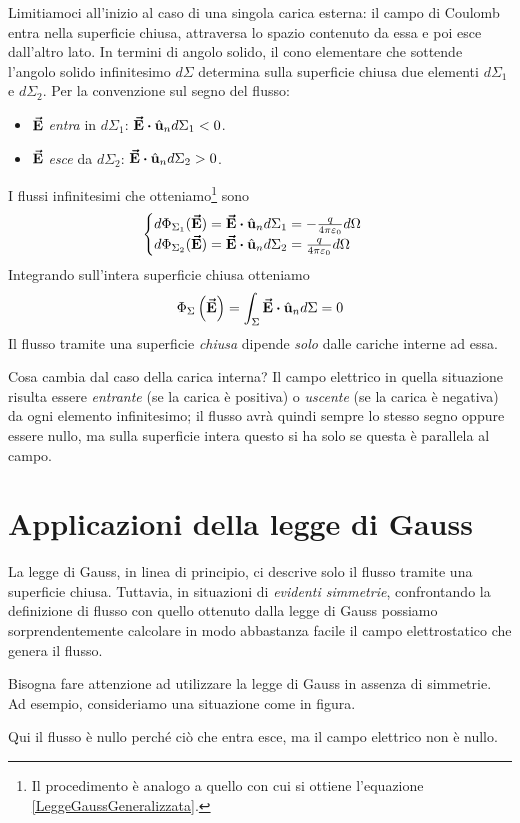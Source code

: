 Limitiamoci all'inizio al caso di una singola carica esterna: il campo di Coulomb entra nella superficie chiusa, attraversa lo spazio contenuto da essa e poi esce dall'altro lato. In termini di angolo solido, il cono elementare che sottende l'angolo solido infinitesimo $d\Sigma$ determina sulla superficie chiusa due elementi $d\Sigma_1$ e $d\Sigma_2$. Per la convenzione sul segno del flusso:
\begin{itemize}
	\item $\vb*{\va{E}}$ \textit{entra} in $d\Sigma_1$: $\vba{E}\vdot \vbh{u}_n d\Sigma_1<0$.
	\item $\vb*{\va{E}}$ \textit{esce} da $d\Sigma_2$: $\vba{E}\vdot \vbh{u}_n d\Sigma_2>0$.
\end{itemize}
I flussi infinitesimi che otteniamo\footnote{Il procedimento è analogo a quello con cui si ottiene l'equazione \ref{LeggeGaussGeneralizzata}.} sono
\begin{equation*}
	\begin{cases}
		d\Phi_{\Sigma_1}(\vba{E})=\vba{E}\vdot \vbh{u}_n d\Sigma_1=-\frac{q}{4\pi\epsilon_0}d\Omega\\
		d\Phi_{\Sigma_2}(\vba{E})=\vba{E}\vdot \vbh{u}_n d\Sigma_2=\frac{q}{4\pi\epsilon_0}d\Omega
	\end{cases}
\end{equation*}
Integrando sull'intera superficie chiusa otteniamo
\begin{equation}
	\Phi_\Sigma\left(\vba{E}\right)=\int_{\Sigma}\vba{E}\vdot\vbh{u}_nd\Sigma=0
\end{equation}
Il flusso tramite una superficie \textit{chiusa} dipende \textit{solo} dalle cariche interne ad essa.
\begin{observe}
	Cosa cambia dal caso della carica interna? Il campo elettrico in quella situazione risulta essere \textit{entrante} (se la carica è positiva) o \textit{uscente} (se la carica è negativa) da ogni elemento infinitesimo; il flusso avrà quindi sempre lo stesso segno oppure essere nullo, ma sulla superficie intera questo si ha solo se questa è parallela al campo.   
\end{observe}
\section{Applicazioni della legge di Gauss}
La legge di Gauss, in linea di principio, ci descrive solo il flusso tramite una superficie chiusa. Tuttavia, in situazioni di \textit{evidenti simmetrie}, confrontando la definizione di flusso con quello ottenuto dalla legge di Gauss possiamo sorprendentemente calcolare in modo abbastanza facile il campo elettrostatico che genera il flusso.
\begin{attention} %
	Bisogna fare attenzione ad utilizzare la legge di Gauss in assenza di simmetrie. Ad esempio, consideriamo una situazione come in figura.
	
	Qui il flusso è nullo perché ciò che entra esce, ma il campo elettrico non è nullo.
\end{attention}
